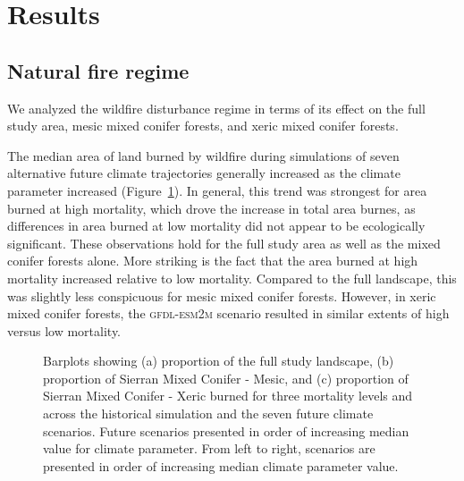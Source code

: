 \section{Results}

\subsection*{Natural fire regime}

We analyzed the wildfire disturbance regime in terms of its effect on the full study area, mesic mixed conifer forests, and xeric mixed conifer forests.

The median area of land burned by wildfire during simulations of seven alternative future climate trajectories generally increased as the climate parameter increased (Figure~\ref{fig:dareacomp}). In general, this trend was strongest for area burned at high mortality, which drove the increase in total area burnes, as differences in area burned at low mortality did not appear to be ecologically significant. These observations hold for the full study area as well as the mixed conifer forests alone. More striking is the fact that the area burned at high mortality increased relative to low mortality. Compared to the full landscape, this was slightly less conspicuous for mesic mixed conifer forests. However, in xeric mixed conifer forests, the \textsc{gfdl-esm2m} scenario resulted in similar extents of high versus low mortality.


\begin{figure}[!htbp]
  \centering


    \caption{Barplots showing (a) proportion of the full study landscape, (b) proportion of Sierran Mixed Conifer - Mesic, and (c) proportion of Sierran Mixed Conifer - Xeric burned for three mortality levels and across the historical simulation and the seven future climate scenarios. Future scenarios presented in order of increasing median value for climate parameter. From left to right, scenarios are presented in order of increasing median climate parameter value.}
  \label{fig:dareacomp}
\end{figure}

